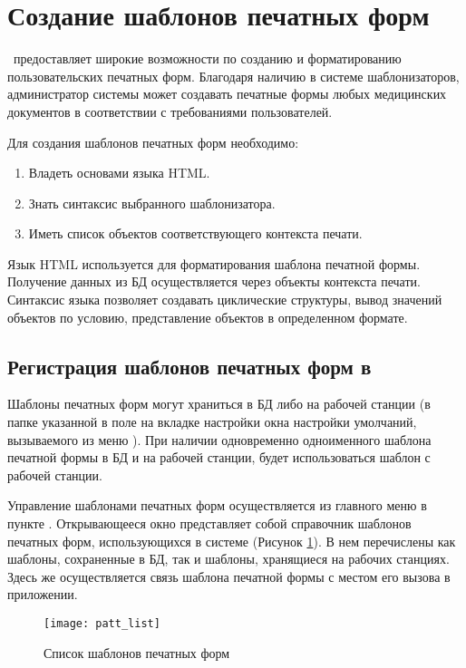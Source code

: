 \newpage
\normalsize
\section{Создание шаблонов печатных форм}

\tmis~предоставляет широкие возможности по созданию и форматированию пользовательских печатных форм. Благодаря наличию в системе шаблонизаторов, администратор системы может создавать печатные формы любых медицинских документов в соответствии с требованиями пользователей.

Для создания шаблонов печатных форм необходимо:
\begin{enumerate}
 \item Владеть основами языка HTML.
 \item Знать синтаксис выбранного шаблонизатора.
 \item Иметь список объектов соответствующего контекста печати.
\end{enumerate}
 
Язык HTML используется для форматирования шаблона печатной формы. Получение данных из БД осуществляется через объекты контекста печати. Синтаксис языка позволяет создавать циклические структуры, вывод значений объектов по условию, представление объектов в определенном формате.

\subsection{Регистрация шаблонов печатных форм в \tmis} \label{patt_add}

Шаблоны печатных форм могут храниться в БД либо на рабочей станции (в папке указанной в поле  на вкладке  настройки окна настройки умолчаний, вызываемого из  меню ). При наличии одновременно одноименного шаблона печатной формы в БД и на рабочей станции, будет использоваться шаблон с рабочей станции.

Управление шаблонами печатных форм осуществляется из главного меню в пункте . Открывающееся окно представляет собой  справочник шаблонов печатных форм, использующихся в системе (Рисунок \ref{img_patt_list}). В нем перечислены как шаблоны, сохраненные в БД, так и шаблоны, хранящиеся на рабочих станциях. Здесь же осуществляется связь шаблона печатной формы с местом его вызова в приложении.

\begin{figure}[ht]\centering
 \texttt{[image: patt\_list]}
 \caption{Список шаблонов печатных форм}
 \label{img_patt_list}
\end{figure}


